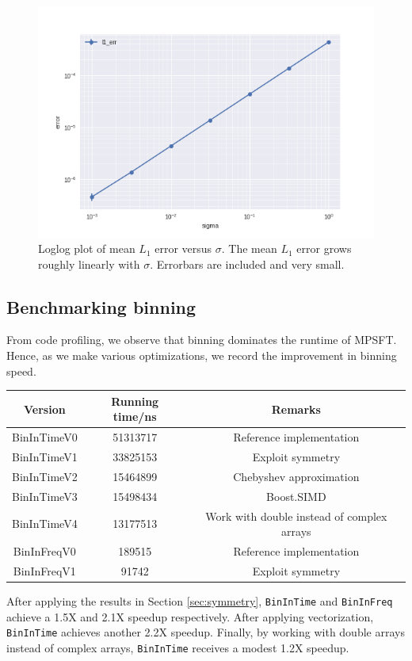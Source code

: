 \documentclass[10pt]{article}
\begin{document}
\begin{figure}
\centering
\includegraphics[scale=0.6]{./graph/noise}
\caption{Loglog plot of mean $L_1$ error versus $\sigma$. The mean $L_1$ error grows roughly linearly with $\sigma$. Errorbars are included and very small. \label{fig:noise}}
\end{figure}

\subsection{Benchmarking binning}
From code profiling, we observe that binning dominates the runtime of MPSFT. Hence, as we make various optimizations, we record the improvement in binning speed.

\begin{center}
\begin{tabular}{|c|c|c|}
\hline
Version & Running time/ns & Remarks \\
\hline
BinInTimeV0 & 51313717 & Reference implementation \\
BinInTimeV1 & 33825153 & Exploit symmetry \\
BinInTimeV2 & 15464899 & Chebyshev approximation \\
BinInTimeV3 & 15498434 & Boost.SIMD \\
BinInTimeV4 & 13177513 & Work with double instead of complex arrays \\
BinInFreqV0 & 189515 & Reference implementation \\
BinInFreqV1 & 91742 & Exploit symmetry\\
\hline
\end{tabular}
\end{center}

After applying the results in Section \ref{sec:symmetry}, \texttt{BinInTime} and \texttt{BinInFreq} achieve a 1.5X and 2.1X speedup respectively. After applying vectorization, \texttt{BinInTime} achieves another 2.2X speedup. Finally, by working with double arrays instead of complex arrays, \texttt{BinInTime} receives a modest 1.2X speedup.



\end{document}
